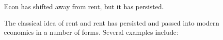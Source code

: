 Econ has shifted away from rent, but it has persisted. 

The classical idea of rent and rent has persisted and passed into modern economics in a number of forms. Several examples include: %


